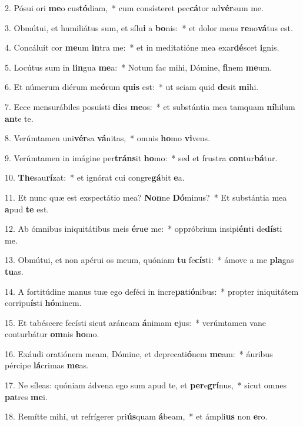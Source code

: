 2. Pósui ori \textbf{me}o cus\textbf{tó}diam,~*  cum consísteret pec\textbf{cá}tor ad\textbf{vér}sum me.\

3. Obmútui, et humiliátus sum, et sílu\textbf{i} a \textbf{bo}nis:~*  et dolor meus \textbf{re}no\textbf{vá}tus est.\

4. Concáluit cor \textbf{me}um \textbf{in}tra me:~*  et in meditatióne mea exar\textbf{dé}scet \textbf{i}gnis.\

5. Locútus sum in \textbf{lin}gua \textbf{me}a:~*  Notum fac mihi, Dómine, \textbf{fi}nem \textbf{me}um.\

6. Et númerum diérum me\textbf{ó}rum \textbf{quis} est:~*  ut sciam quid \textbf{de}sit \textbf{mi}hi.\

7. Ecce mensurábiles posuísti \textbf{di}es \textbf{me}os:~*  et substántia mea tamquam \textbf{ní}hilum \textbf{an}te te.\

8. Verúmtamen uni\textbf{vér}sa \textbf{vá}nitas,~*  omnis \textbf{ho}mo \textbf{vi}vens.\

9. Verúmtamen in imágine per\textbf{tráns}it \textbf{ho}mo:~*  sed et frustra \textbf{con}tur\textbf{bá}tur.\

10. \textbf{The}sau\textbf{rí}zat:~*  et ignórat cui congre\textbf{gá}bit \textbf{e}a.\

11. Et nunc quæ est exspectátio mea? \textbf{Non}ne \textbf{Dó}minus?~*  Et substántia mea \textbf{a}pud \textbf{te} est.\

12. Ab ómnibus iniquitátibus meis \textbf{é}ru\textbf{e} me:~*  oppróbrium insipi\textbf{én}ti de\textbf{dís}ti me.\

13. Obmútui, et non apérui os meum, quóniam \textbf{tu} fe\textbf{cís}ti:~*  ámove a me \textbf{pla}gas \textbf{tu}as.\

14. A fortitúdine manus tuæ ego deféci in incre\textbf{pa}ti\textbf{ó}nibus:~*  propter iniquitátem corripu\textbf{ís}ti \textbf{hó}minem.\

15. Et tabéscere fecísti sicut aráneam \textbf{á}nimam \textbf{e}jus:~*  verúmtamen vane conturbátur \textbf{om}nis \textbf{ho}mo.\

16. Exáudi oratiónem meam, Dómine, et deprecati\textbf{ó}nem \textbf{me}am:~*  áuribus pércipe \textbf{lá}crimas \textbf{me}as.\

17. Ne síleas: quóniam ádvena ego sum apud te, et \textbf{per}e\textbf{grí}nus,~*  sicut omnes \textbf{pa}tres \textbf{me}i.\

18. Remítte mihi, ut refrígerer pri\textbf{ús}quam \textbf{á}beam,~*  et ámpli\textbf{us} non \textbf{e}ro.\

